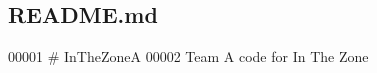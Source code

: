 \subsection{R\+E\+A\+D\+M\+E.\+md}

\begin{DoxyCode}
00001 # InTheZoneA
00002 Team A code for In The Zone
\end{DoxyCode}
